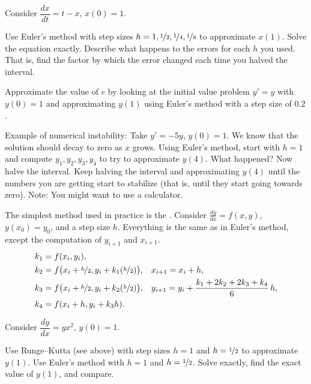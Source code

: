 \begin{samepage}
\begin{exercise}
Consider $\dfrac{dx}{dt} = t-x$, $x(0)=1$.
\begin{tasks}
\task Use Euler's method
with step sizes $h = 1, \nicefrac{1}{2}, \nicefrac{1}{4}, \nicefrac{1}{8}$ to
approximate
$x(1)$. 
\task Solve the equation exactly.
\task Describe what happens to the
errors for each $h$ you used.  That is, find the factor by which the error
changed each time you halved the interval.
\end{tasks}
\end{exercise}
\end{samepage}

\begin{exercise}
Approximate the value of $e$ by looking at the initial value problem
$y'=y$ with $y(0)=1$ and approximating $y(1)$ using Euler's method with
a step size of $0.2$.
\end{exercise}

\begin{exercise}
Example of numerical instability:
Take $y' = -5y$, $y(0) = 1$.  We know that the
solution should decay to zero as $x$ grows.
Using Euler's method, start with $h=1$ and compute
$y_1, y_2, y_3, y_4$ to try to approximate $y(4)$.  What happened?
Now halve the interval.  Keep halving the interval and approximating $y(4)$
until the numbers you are getting
start to stabilize (that is, until they start going towards zero).
Note: You might want to use a calculator.
\end{exercise}

The simplest method used in practice is the
\emph{}.
Consider $\frac{dy}{dx}=f(x,y)$, $y(x_0) = y_0$,
and a step size $h$.  Everything is the same as in Euler's method, except
the computation of $y_{i+1}$ and $x_{i+1}$.
\begin{align*}
& k_1 = f(x_i,y_i) , & & \\
& k_2 = f\bigl(x_i + \nicefrac{h}{2},y_i + k_1 (\nicefrac{h}{2})\bigr) ,
& & 
x_{i+1} = x_i + h , \\
& k_3 = f\bigl(x_i + \nicefrac{h}{2},y_i + k_2 (\nicefrac{h}{2})\bigr) ,
& &
y_{i+1} = y_i + \frac{k_1 + 2k_2 + 2k_3 + k_4}{6}\,h ,  \\
& k_4 = f(x_i + h,y_i + k_3 h) .
\end{align*}


\begin{exercise}
\pagebreak[2]
Consider $\dfrac{dy}{dx} = yx^2$, $y(0)=1$.
\begin{tasks}
\task Use Runge--Kutta (see above) with step sizes $h=1$ and $h=\nicefrac{1}{2}$
to approximate $y(1)$.
\task Use Euler's method with $h=1$ and
$h=\nicefrac{1}{2}$.
\task Solve exactly, find the exact value of
$y(1)$, and compare.
\end{tasks}
\end{exercise}



